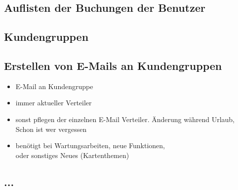 \subsection{Auflisten der Buchungen der Benutzer}
\subsection{Kundengruppen}
\subsection{Erstellen von E-Mails an Kundengruppen}
\begin{itemize}
	\item E-Mail an Kundengruppe
	\item immer aktueller Verteiler
	\item sonst pflegen der einzelnen E-Mail Verteiler. Änderung während Urlaub, Schon ist wer vergessen
	\item benötigt bei Wartungsarbeiten, neue Funktionen,\\ oder sonstiges Neues (Kartenthemen)
\end{itemize}
\subsection{...}

